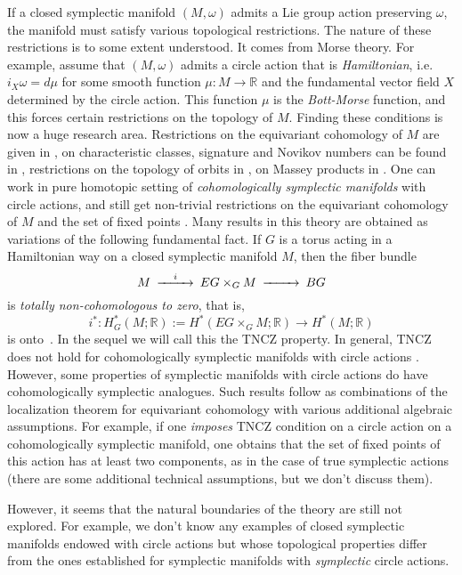 \documentclass[12pt]{amsart}
\newcommand{\B}[1]{{\mathbb #1}}
\newcommand\R{\B R}
\numberwithin{equation}{section}
\theoremstyle{definition}
\theoremstyle{remark}
\numberwithin{figure}{section}
\numberwithin{table}{section}
\begin{document}
If  a closed symplectic manifold $(M,\omega)$ admits a Lie group action  
preserving $\omega$, the manifold must satisfy various topological  
restrictions. The nature of these restrictions is to some extent understood. It  
comes from  Morse theory. For example, assume that $(M,\omega)$ admits a  
circle action that is {\it Hamiltonian}, i.e. $i_X\omega=d\mu$ for some smooth  
function $\mu: M\rightarrow \mathbb{R}$ and the fundamental vector field $X$  
determined by the circle action. This function $\mu$ is the {\it  
Bott-Morse} function, and this forces certain restrictions on the  
topology of $M$. Finding these conditions is now a huge research area.  
Restrictions on the equivariant cohomology of $M$ are given in \cite{Ki, TW},  
 on characteristic classes, signature and Novikov numbers can be  
found in \cite{Fa, Fe}, restrictions on the topology of orbits in \cite{Oz,Ko},  
on Massey products in \cite{ST}. One can work in   pure homotopic setting  
of {\it cohomologically symplectic manifolds} with circle actions, and  
still get non-trivial restrictions on the equivariant cohomology of $M$ and the  
set of fixed points \cite{A1,A2}. Many results in this theory are obtained as  
variations of the following fundamental fact. If $G$ is a torus acting in a  
Hamiltonian way on a closed  symplectic manifold $M$, then the fiber bundle 
$$ 
\CD 
M @>{i}>> EG\times _GM @>>> BG 
\endCD 
$$ 
is {\it totally non-cohomologous to zero}, that is,  
$$ 
i^*: H^*_G(M;\R):=H^*(EG\times _GM;\R)\rightarrow H^*(M;\R) 
$$ 
is onto~\cite{Ki}. In the sequel we will call this the TNCZ property. In 
general, TNCZ does not hold for cohomologically symplectic manifolds with circle  
actions \cite{A1}. However, some properties of symplectic manifolds with  circle 
actions   
do have cohomologically symplectic analogues. Such results  follow  
as combinations of the localization theorem for equivariant cohomology with  
various additional algebraic assumptions. For example, if one {\it imposes}  
TNCZ condition on a circle action on a   
cohomologically symplectic manifold, one obtains that the set of fixed points of 
this action has at least   
two components, as in the case of true symplectic actions \cite{A1,A2}(there are 
some additional technical assumptions, but we   
don't discuss them). 
 
However, it seems that the natural boundaries of the theory are still not  
explored. For example, we 
don't know any examples of closed symplectic manifolds endowed with circle  
actions but whose topological properties differ from the ones established for  
symplectic manifolds with {\it symplectic} circle actions.  
 
\end{document}
